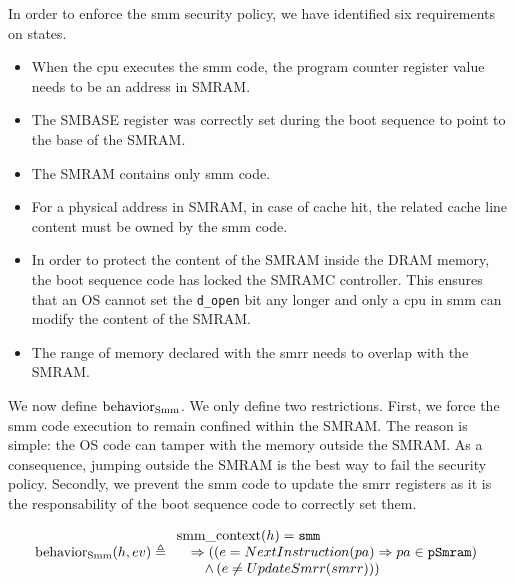 In order to enforce the \ac{smm} security policy, we have identified six
requirements on states.
\begin{itemize}
\item When the \ac{cpu} executes the \ac{smm} code, the program counter register
  value needs to be an address in SMRAM.
\item The SMBASE register was correctly set during the boot sequence to point to
  the base of the SMRAM.
\item The SMRAM contains only \ac{smm} code.
\item For a physical address in SMRAM, in case of cache hit, the related cache
  line content must be owned by the \ac{smm} code.
\item In order to protect the content of the SMRAM inside the DRAM memory, the
  boot sequence code has locked the SMRAMC controller. This ensures that an OS
  cannot set the \texttt{d\_open} bit any longer and only a \ac{cpu} in \ac{smm}
  can modify the content of the SMRAM.
\item The range of memory declared with the \ac{smrr} needs to overlap with the
  SMRAM.
\end{itemize}


We now define $\mathrm{behavior_{Smm}}$.
%
We only define two restrictions.
%
First, we force the \ac{smm} code execution to remain confined within the SMRAM.
%
The reason is simple: the OS code can tamper with the memory outside the SMRAM.
%
As a consequence, jumping outside the SMRAM is the best way to fail the security
policy.
%
Secondly, we prevent the \ac{smm} code to update the \ac{smrr} registers as it
is the responsability of the boot sequence code to correctly set them.

\[
  \mathrm{behavior_{Smm}}(h, ev) \triangleq
  \begin{array}{l}
    \mathrm{smm\_context}(h) = \mathtt{smm} \\
    \quad \Rightarrow ((e =
    NextInstruction(pa)
    \Rightarrow pa \in \texttt{pSmram}) \\
    \qquad \wedge\,(e \neq UpdateSmrr(smrr))) \\
  \end{array}
\]


